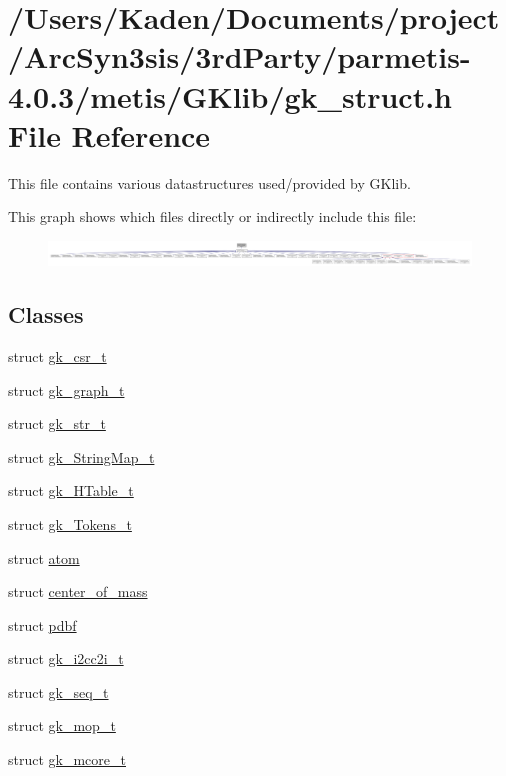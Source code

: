 \hypertarget{a00080}{}\section{/\+Users/\+Kaden/\+Documents/project/\+Arc\+Syn3sis/3rd\+Party/parmetis-\/4.0.3/metis/\+G\+Klib/gk\+\_\+struct.h File Reference}
\label{a00080}


This file contains various datastructures used/provided by G\+Klib.  


This graph shows which files directly or indirectly include this file\+:\nopagebreak
\begin{figure}[H]
\begin{center}
\leavevmode
\includegraphics[width=350pt]{a00082}
\end{center}
\end{figure}
\subsection*{Classes}
\begin{DoxyCompactItemize}
\item 
struct \hyperlink{a00634}{gk\+\_\+csr\+\_\+t}
\item 
struct \hyperlink{a00638}{gk\+\_\+graph\+\_\+t}
\item 
struct \hyperlink{a00642}{gk\+\_\+str\+\_\+t}
\item 
struct \hyperlink{a00646}{gk\+\_\+\+String\+Map\+\_\+t}
\item 
struct \hyperlink{a00650}{gk\+\_\+\+H\+Table\+\_\+t}
\item 
struct \hyperlink{a00654}{gk\+\_\+\+Tokens\+\_\+t}
\item 
struct \hyperlink{a00658}{atom}
\item 
struct \hyperlink{a00662}{center\+\_\+of\+\_\+mass}
\item 
struct \hyperlink{a00666}{pdbf}
\item 
struct \hyperlink{a00670}{gk\+\_\+i2cc2i\+\_\+t}
\item 
struct \hyperlink{a00674}{gk\+\_\+seq\+\_\+t}
\item 
struct \hyperlink{a00678}{gk\+\_\+mop\+\_\+t}
\item 
struct \hyperlink{a00682}{gk\+\_\+mcore\+\_\+t}
\end{DoxyCompactItemize}
